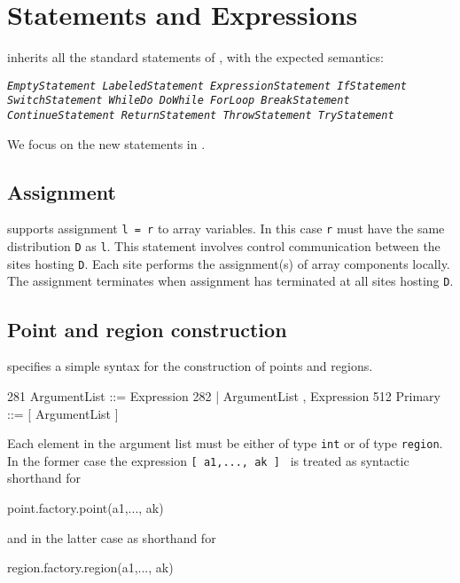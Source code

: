 \chapter{Statements and Expressions}\label{XtenStatements}

\Xten{} inherits all the standard statements of \Java{}, with the expected semantics:

\begin{x10}
\em\tt EmptyStatement      LabeledStatement  
\em\tt ExpressionStatement IfStatement
\em\tt SwitchStatement     WhileDo
\em\tt DoWhile             ForLoop           
\em\tt BreakStatement      ContinueStatement  
\em\tt ReturnStatement   ThrowStatement
\em\tt TryStatement
\end{x10}

We focus on the new statements in \Xten. 

\section{Assignment}\label{AssignmentStatement}

%

{}\Xten{} supports assignment {\tt l = r} to array variables. In this
case {\tt r} must have the same distribution {\tt D} as {\tt l}. This
statement involves control communication between the sites hosting
{\tt D}. Each site performs the assignment(s) of array components
locally. The assignment terminates when assignment has terminated at
all sites hosting {\tt D}.


\section{Point and region construction}\label{point-syntax}
\Xten{} specifies a simple syntax for the construction of points and regions.
\begin{x10}
281   ArgumentList ::= Expression
282                  | ArgumentList , Expression
512   Primary ::= [ ArgumentList ]
\end{x10}
Each element in the argument list must be either of type {\tt int} or 
of type {\tt region}. In the former case the expression 
{\tt [ a1,..., ak ] } is treated as syntactic shorthand for
\begin{x10}
  point.factory.point(a1,..., ak)
\end{x10}
\noindent and in the latter case as shorthand for
\begin{x10}
  region.factory.region(a1,..., ak)
\end{x10}

